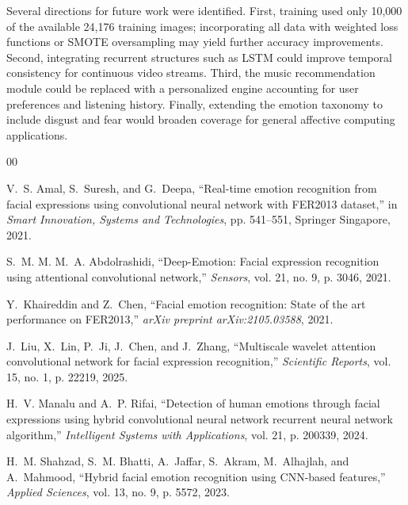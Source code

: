 \documentclass[conference]{IEEEtran}
\begin{document}
Several directions for future work were identified. First, training used only
10,000 of the available 24,176 training images; incorporating all data with
weighted loss functions or SMOTE oversampling may yield further accuracy
improvements. Second, integrating recurrent structures such as LSTM \cite{b5}
could improve temporal consistency for continuous video streams. Third, the
music recommendation module could be replaced with a personalized engine
accounting for user preferences and listening history. Finally, extending
the emotion taxonomy to include disgust and fear would broaden coverage for
general affective computing applications.

\begin{thebibliography}{00}

V.~S. Amal, S.~Suresh, and G.~Deepa,
``Real-time emotion recognition from facial expressions using convolutional
neural network with FER2013 dataset,''
in \textit{Smart Innovation, Systems and Technologies},
pp. 541--551, Springer Singapore, 2021.

S.~M. M. M.~A. Abdolrashidi,
``Deep-Emotion: Facial expression recognition using attentional convolutional
network,''
\textit{Sensors}, vol. 21, no. 9, p. 3046, 2021.

Y.~Khaireddin and Z.~Chen,
``Facial emotion recognition: State of the art performance on FER2013,''
\textit{arXiv preprint arXiv:2105.03588}, 2021.

J.~Liu, X.~Lin, P.~Ji, J.~Chen, and J.~Zhang,
``Multiscale wavelet attention convolutional network for facial expression
recognition,''
\textit{Scientific Reports}, vol. 15, no. 1, p. 22219, 2025.

H.~V. Manalu and A.~P. Rifai,
``Detection of human emotions through facial expressions using hybrid
convolutional neural network recurrent neural network algorithm,''
\textit{Intelligent Systems with Applications}, vol. 21, p. 200339, 2024.

H.~M. Shahzad, S.~M. Bhatti, A.~Jaffar, S.~Akram, M.~Alhajlah,
and A.~Mahmood,
``Hybrid facial emotion recognition using CNN-based features,''
\textit{Applied Sciences}, vol. 13, no. 9, p. 5572, 2023.

\end{thebibliography}
\end{document}
